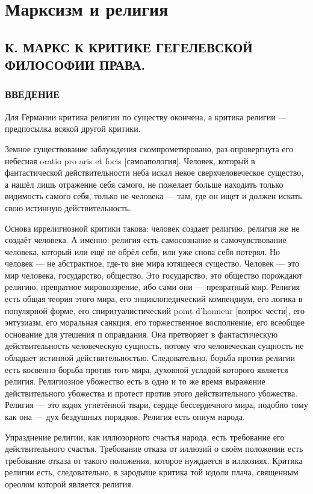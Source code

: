 \documentclass[12pt]{article}
\newcommand\resetparcount{%
  \setcounter{parcount}{0}
}
\newcommand{\parnum}{(\arabic{parcount})}
\newcounter{parcount}
\newenvironment{parnumbers}{%
  \par%
  \everypar{\noindent \stepcounter{parcount}\marginpar[]{\parnum}}%
}{}
\begin{document}
\section{Марксизм и религия}
\resetparcount

\subsection{К. МАРКС К КРИТИКЕ ГЕГЕЛЕВСКОЙ ФИЛОСОФИИ ПРАВА.}
\subsubsection*{ВВЕДЕНИЕ}
\begin{parnumbers}
Для Германии критика религии по существу окончена, а критика религии — предпосылка всякой другой критики.

Земное существование заблуждения скомпрометировано, раз опровергнута его небесная oratio pro aris et focis [самоапология]. Человек, который в фантастической действительности неба искал некое сверхчеловеческое существо, а нашёл лишь отражение себя самого, не пожелает больше находить только видимость самого себя, только не-человека — там, где он ищет и должен искать свою истинную действительность.

Основа иррелигиозной критики такова: человек создает религию, религия же не создаёт человека. А именно: религия есть самосознание и самочувствование человека, который или ещё не обрёл себя, или уже снова себя потерял. Но человек — не абстрактное, где-то вне мира ютящееся существо. Человек — это мир человека, государство, общество. Это государство, это общество порождают религию, превратное мировоззрение, ибо сами они — превратный мир. Религия есть общая теория этого мира, его энциклопедический компендиум, его логика в популярной форме, его спиритуалистический point d'honneur [вопрос чести], его энтузиазм, его моральная санкция, его торжественное восполнение, его всеобщее основание для утешения п оправдания. Она претворяет в фантастическую действительность человеческую сущность, потому что человеческая сущность не обладает истинной действительностью. Следовательно, борьба против религии есть косвенно борьба против того мира, духовной усладой которого является религия. Религиозное убожество есть в одно и то же время выражение действительного убожества и протест против этого действительного убожества. Религия — это вздох угнетённой твари, сердце бессердечного мира, подобно тому как она — дух бездушных порядков. Религия есть опиум народа.

Упразднение религии, как иллюзорного счастья народа, есть требование его действительного счастья. Требование отказа от иллюзий о своём положении есть требование отказа от такого положения, которое нуждается в иллюзиях. Критика религии есть, следовательно, в зародыше критика той юдоли плача, священным ореолом которой является религия.


\end{parnumbers}
\end{document}
